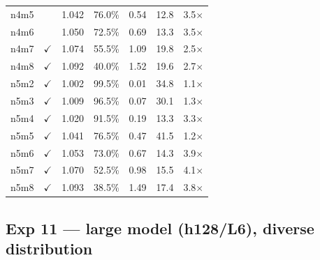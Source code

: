 \documentclass[11pt,a4paper]{article}
\begin{document}
\begin{longtable}{llccccc}
n4m5 &              & 1.042 & 76.0\% & 0.54 & 12.8 & 3.5$\times$ \\
n4m6 &              & 1.050 & 72.5\% & 0.69 & 13.3 & 3.5$\times$ \\
n4m7 & $\checkmark$ & 1.074 & 55.5\% & 1.09 & 19.8 & 2.5$\times$ \\
n4m8 & $\checkmark$ & 1.092 & 40.0\% & 1.52 & 19.6 & 2.7$\times$ \\
n5m2 & $\checkmark$ & 1.002 & 99.5\% & 0.01 & 34.8 & 1.1$\times$ \\
n5m3 & $\checkmark$ & 1.009 & 96.5\% & 0.07 & 30.1 & 1.3$\times$ \\
n5m4 & $\checkmark$ & 1.020 & 91.5\% & 0.19 & 13.3 & 3.3$\times$ \\
n5m5 & $\checkmark$ & 1.041 & 76.5\% & 0.47 & 41.5 & 1.2$\times$ \\
n5m6 & $\checkmark$ & 1.053 & 73.0\% & 0.67 & 14.3 & 3.9$\times$ \\
n5m7 & $\checkmark$ & 1.070 & 52.5\% & 0.98 & 15.5 & 4.1$\times$ \\
n5m8 & $\checkmark$ & 1.093 & 38.5\% & 1.49 & 17.4 & 3.8$\times$ \\
\end{longtable}

\subsection{Exp 11 --- large model (h128/L6), diverse distribution}
\label{app:exp11}
\end{document}
